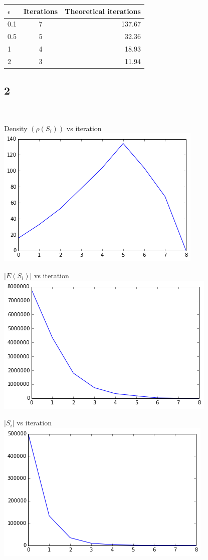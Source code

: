 \documentclass[11pt]{article}
\begin{document}
{\begin{tabular}{l | c | r}
\hline $\epsilon$ & Iterations & Theoretical iterations \\
\hline 0.1 & 7 & 137.67\\
\hline 0.5 & 5 & 32.36\\
\hline 1 & 4 & 18.93\\
\hline 2 & 3 & 11.94\\
\hline
\end{tabular}

\pagebreak[4]
\subsection*{2}
\

Density $(\rho(S_i))$ vs iteration\\
\includegraphics[scale=0.8]{q4c2density}\
\vspace{3cm}

$|E(S_i)|$ vs iteration\\
\includegraphics[scale=0.8]{q4c2indsetcnt}\\
\vspace{3cm}

$|S_i|$ vs iteration\\
\includegraphics[scale=0.8]{q4c2scnt}\


}
\end{document}
